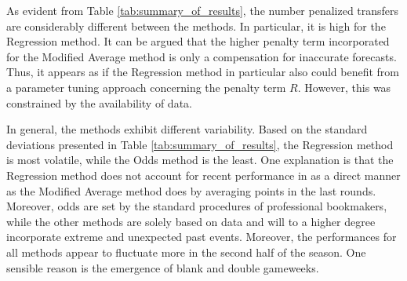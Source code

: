 \newpar

As evident from Table \ref{tab:summary_of_results}, the number penalized transfers are considerably different between the methods. In particular, it is high for the Regression method. It can be argued that the higher penalty term incorporated for the Modified Average method is only a compensation for inaccurate forecasts. Thus, it appears as if the Regression method in particular also could benefit from a parameter tuning approach concerning the penalty term $R$. However, this was constrained by the availability of data. 


\newpar 

In general, the methods exhibit different variability. Based on the standard deviations presented in Table \ref{tab:summary_of_results}, the Regression method is most volatile, while the Odds method is the least. One explanation is that the Regression method does not account for recent performance in as a direct manner as the Modified Average method does by averaging points in the last rounds. Moreover, odds are set by the standard procedures of professional bookmakers, while the other methods are solely based on data and will to a higher degree incorporate extreme and unexpected past events. Moreover, the performances for all methods appear to fluctuate more in the second half of the season. One sensible reason is the emergence of blank and double gameweeks.

\newpar

